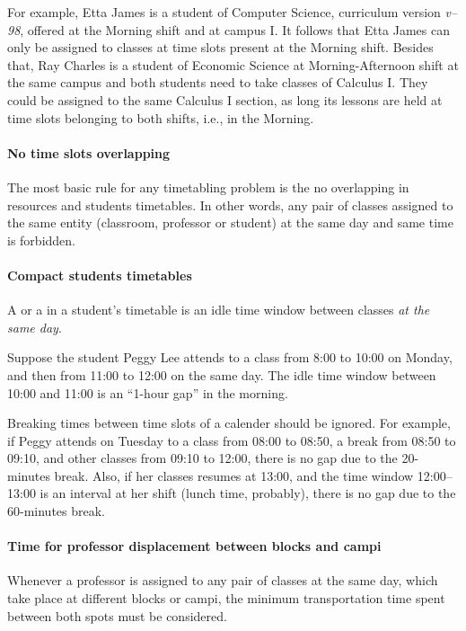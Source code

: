 For example, Etta James is a student of Computer Science, curriculum version \textit{v--98}, offered at the Morning shift and at campus I. It follows that Etta James can only be assigned to classes at time slots present at the Morning shift. Besides that, Ray Charles is a student of Economic Science at Morning-Afternoon shift at the same campus and both students need to take classes of Calculus I. They could be assigned to the same Calculus I section, as long its lessons are held at time slots belonging to both shifts, i.e., in the Morning.


\paragraph{No time slots overlapping}
\label{constroverlap}

The most basic rule for any timetabling problem is the no overlapping in resources and students timetables. In other words, any pair of classes assigned to the same entity (classroom, professor or student) at the same day and same time is forbidden.


\paragraph{Compact students timetables}
\label{constrmingapstudent}

A  or a  in a student's timetable is an idle time window between classes \textit{at the same day}.

Suppose the student Peggy Lee attends to a class from 8:00 to 10:00 on Monday, and then from 11:00 to 12:00 on the same day. The idle time window between 10:00 and 11:00 is an ``1-hour gap'' in the morning.

Breaking times between time slots of a calender should be ignored. For example, if Peggy attends on Tuesday to a class from 08:00 to 08:50, a break from 08:50 to 09:10, and other classes from 09:10 to 12:00, there is no gap due to the 20-minutes break. Also, if her classes resumes at 13:00, and the time window 12:00--13:00 is an interval at her shift (lunch time, probably), there is no gap due to the 60-minutes break.


\paragraph{Time for professor displacement between blocks and campi}
\label{constrprofdisplactime}

Whenever a professor is assigned to any pair of classes at the same day, which take place at different blocks or campi, the minimum transportation time spent between both spots must be considered.



